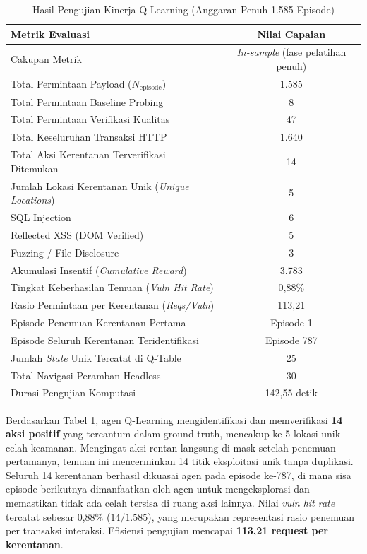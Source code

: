 \begin{enumerate}
\begin{table}[H]
\centering
\caption{Hasil Pengujian Kinerja Q-Learning (Anggaran Penuh 1.585 Episode)}
\label{tab:ql_results}
\begin{tabular}{|l|c|}
\hline
\textbf{Metrik Evaluasi} & \textbf{Nilai Capaian} \\
\hline
Cakupan Metrik & \textit{In-sample} (fase pelatihan penuh) \\
Total Permintaan Payload ($N_{\text{episode}}$) & 1.585 \\
Total Permintaan Baseline Probing & 8 \\
Total Permintaan Verifikasi Kualitas & 47 \\ 
Total Keseluruhan Transaksi HTTP & 1.640 \\ 
Total Aksi Kerentanan Terverifikasi Ditemukan & 14 \\
Jumlah Lokasi Kerentanan Unik (\textit{Unique Locations}) & 5 \\
SQL Injection & 6 \\
Reflected XSS (DOM Verified) & 5 \\
Fuzzing / File Disclosure & 3 \\
Akumulasi Insentif (\textit{Cumulative Reward}) & 3.783 \\ 
Tingkat Keberhasilan Temuan (\textit{Vuln Hit Rate}) & 0,88\% \\
Rasio Permintaan per Kerentanan (\textit{Reqs/Vuln}) & 113,21 \\
Episode Penemuan Kerentanan Pertama & Episode 1 \\
Episode Seluruh Kerentanan Teridentifikasi & Episode 787 \\
Jumlah \textit{State} Unik Tercatat di Q-Table & 25 \\ 
Total Navigasi Peramban Headless & 30 \\ 
Durasi Pengujian Komputasi & 142,55 detik \\ 
\hline
\end{tabular}
\end{table}

Berdasarkan Tabel \ref{tab:ql_results}, agen Q-Learning mengidentifikasi dan memverifikasi \textbf{14 aksi positif} yang tercantum dalam ground truth, mencakup ke-5 lokasi unik celah keamanan. Mengingat aksi rentan langsung di-mask setelah penemuan pertamanya, temuan ini mencerminkan 14 titik eksploitasi unik tanpa duplikasi. Seluruh 14 kerentanan berhasil dikuasai agen pada episode ke-787, di mana sisa episode berikutnya dimanfaatkan oleh agen untuk mengeksplorasi dan memastikan tidak ada celah tersisa di ruang aksi lainnya. Nilai \textit{vuln hit rate} tercatat sebesar 0,88\% ($14 / 1.585$), yang merupakan representasi rasio penemuan per transaksi interaksi. Efisiensi pengujian mencapai \textbf{113,21 request per kerentanan}.


\end{enumerate}

